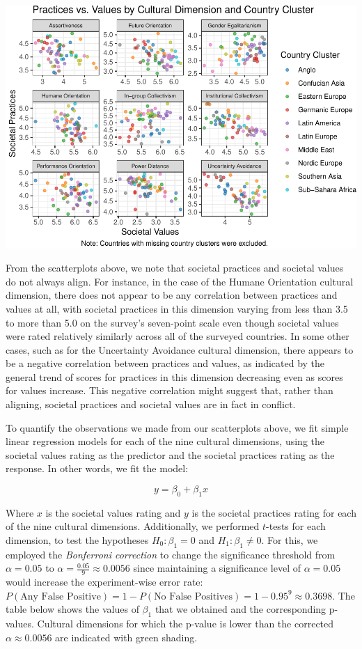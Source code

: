 \documentclass[
]{article}
\begin{document}
\begin{center}\includegraphics[width=0.85\linewidth]{final_report_files/figure-latex/SPV Plots-1} \end{center}

From the scatterplots above, we note that societal practices and
societal values do not always align. For instance, in the case of the
Humane Orientation cultural dimension, there does not appear to be any
correlation between practices and values at all, with societal practices
in this dimension varying from less than 3.5 to more than 5.0 on the
survey's seven-point scale even though societal values were rated
relatively similarly across all of the surveyed countries. In some other
cases, such as for the Uncertainty Avoidance cultural dimension, there
appears to be a negative correlation between practices and values, as
indicated by the general trend of scores for practices in this dimension
decreasing even as scores for values increase. This negative correlation
might suggest that, rather than aligning, societal practices and
societal values are in fact in conflict.

To quantify the observations we made from our scatterplots above, we fit
simple linear regression models for each of the nine cultural
dimensions, using the societal values rating as the predictor and the
societal practices rating as the response. In other words, we fit the
model:

\[
y = \beta_0 + \beta_1 x
\]

Where \(x\) is the societal values rating and \(y\) is the societal
practices rating for each of the nine cultural dimensions. Additionally,
we performed \(t\)-tests for each dimension, to test the hypotheses
\(H_0: \beta_1 = 0\) and \(H_1: \beta_1 \ne 0\). For this, we employed
the \emph{Bonferroni correction} to change the significance threshold
from \(\alpha = 0.05\) to \(\alpha = \frac{0.05}{9} \approx 0.0056\)
since maintaining a significance level of \(\alpha = 0.05\) would
increase the experiment-wise error rate:
\(P(\text{Any False Positive}) = 1 - P(\text{No False Positives}) = 1 - 0.95^{9} \approx 0.3698\).
The table below shows the values of \(\beta_1\) that we obtained and the
corresponding p-values. Cultural dimensions for which the p-value is
lower than the corrected \(\alpha \approx 0.0056\) are indicated with
green shading.
\end{document}
